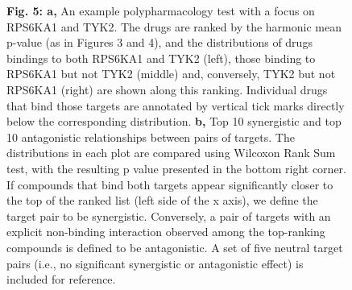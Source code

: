 \documentclass{article}
\begin{document}
\begin{figure}
  \caption{\textbf{Fig. 5: a,} An example polypharmacology test with a focus on RPS6KA1 and TYK2. The drugs are ranked by the harmonic mean p-value (as in Figures 3 and 4), and the distributions of drugs bindings to both RPS6KA1 and TYK2 (left), those binding to RPS6KA1 but not TYK2 (middle) and, conversely, TYK2 but not RPS6KA1 (right) are shown along this ranking. Individual drugs that bind those targets are annotated by vertical tick marks directly below the corresponding distribution. \textbf{b,} Top 10 synergistic and top 10 antagonistic relationships between pairs of targets. The distributions in each plot are compared using Wilcoxon Rank Sum test, with the resulting p value presented in the bottom right corner. If compounds that bind both targets appear significantly closer to the top of the ranked list (left side of the x axis), we define the target pair to be synergistic. Conversely, a pair of targets with an explicit non-binding interaction observed among the top-ranking compounds is defined to be antagonistic. A set of five neutral target pairs (i.e., no significant synergistic or antagonistic effect) is included for reference.}
\end{figure}
\end{document}
